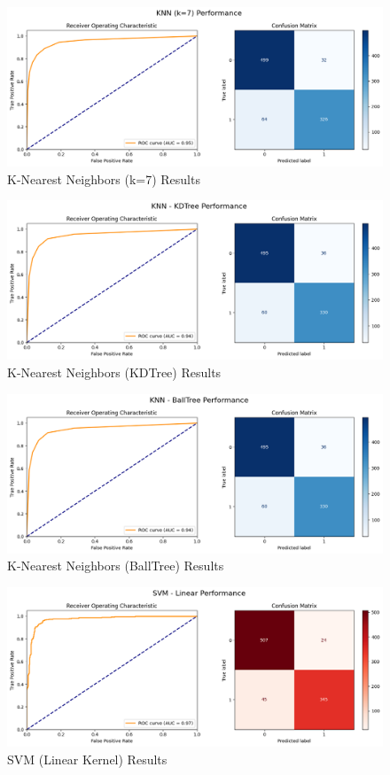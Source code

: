 \documentclass[12pt]{article}
\begin{document}
\begin{figure}[H]
\centering
\includegraphics[width=1\textwidth]{images/knn4.png}
\caption{K-Nearest Neighbors (k=7) Results}
\end{figure}

\begin{figure}[H]
\centering
\includegraphics[width=1\textwidth]{images/knn5.png}
\caption{K-Nearest Neighbors (KDTree) Results}
\end{figure}

\begin{figure}[H]
\centering
\includegraphics[width=1\textwidth]{images/knn6.png}
\caption{K-Nearest Neighbors (BallTree) Results}
\end{figure}
\begin{figure}[H]
\centering
\includegraphics[width=1\textwidth]{images/svm1.png}
\caption{SVM (Linear Kernel) Results}
\end{figure}
\end{document}
